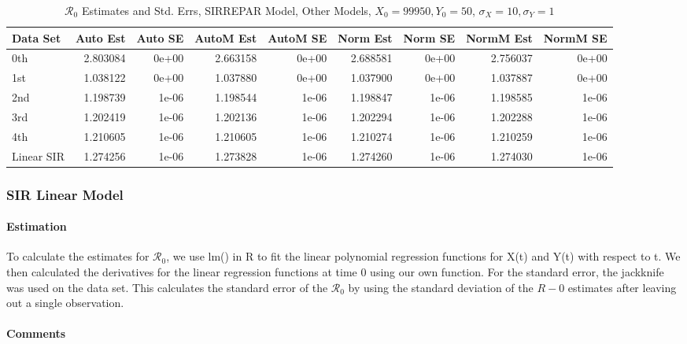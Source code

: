 \documentclass[12pt]{article}
\newcommand{\rr}{\ensuremath{\mathcal{R}_0}}
\begin{document}
\begin{table}[H]
	
	\caption{$\rr$ Estimates and Std. Errs, SIRREPAR Model,
		Other Models, $X_0 = 99950, Y_0 = 50$, 
		$\sigma_X = 10, \sigma_Y = 1$}
	\begin{footnotesize}
		\hskip -1cm
		\begin{tabular}{l|r|r|r|r|r|r|r|r}
			\hline
			Data Set & Auto Est & Auto SE & AutoM Est & AutoM SE & Norm Est & Norm SE & NormM Est & NormM SE\\
			\hline
			0th & 2.803084 & 0e+00 & 2.663158 & 0e+00 & 2.688581 & 0e+00 & 2.756037 & 0e+00\\
			\hline
			1st & 1.038122 & 0e+00 & 1.037880 & 0e+00 & 1.037900 & 0e+00 & 1.037887 & 0e+00\\
			\hline
			2nd & 1.198739 & 1e-06 & 1.198544 & 1e-06 & 1.198847 & 1e-06 & 1.198585 & 1e-06\\
			\hline
			3rd & 1.202419 & 1e-06 & 1.202136 & 1e-06 & 1.202294 & 1e-06 & 1.202288 & 1e-06\\
			\hline
			4th & 1.210605 & 1e-06 & 1.210605 & 1e-06 & 1.210274 & 1e-06 & 1.210259 & 1e-06\\
			\hline
			Linear SIR & 1.274256 & 1e-06 & 1.273828 & 1e-06 & 1.274260 & 1e-06 & 1.274030 & 1e-06\\
			\hline
		\end{tabular}
	\end{footnotesize}
\end{table}

\subsubsection{SIR Linear Model}

\paragraph{Estimation}

To calculate the estimates for $\rr$, we use lm() in R to fit the linear polynomial regression functions for X(t) and Y(t) with respect to t. We then calculated the derivatives for the linear regression functions at time 0 using our own function. For the standard error, the jackknife was used on the data set. This calculates the standard error of the $\rr$ by using the standard deviation of the $R-0$ estimates after leaving out a single observation.

\paragraph{Comments}
\end{document}
